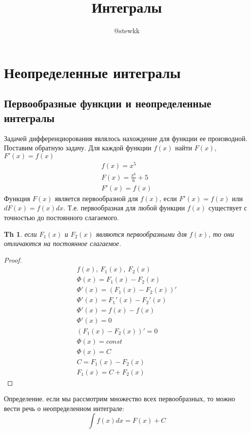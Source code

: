 \documentclass[12pt,a4paper]{article}
\title{Интегралы}
\author{@stewkk}
\newtheorem{theorem}{Th}
\begin{document}
\maketitle
\section{Неопределенные интегралы}
\subsection{Первообразные функции и неопределенные интегралы}
Задачей дифференциорования являлось нахождение для функции ее производной.
Поставим обратную задачу.
Для каждой функции $f(x)$ найти $F(x)$, $F'(x)=f(x)$
    \begin{gather*}
    f(x) = x^5\\
    F(x) = \frac{x^6}{6} + 5\\
    F'(x) = f(x)
    \end{gather*}
Функция $F(x)$ является первообразной для $f(x)$, если $F'(x)=f(x)$ или $dF(x)=f(x)dx$.
Т.е. первообразная для любой функции $f(x)$ существует с точностью до постоянного слагаемого.

\begin{theorem}
    если $F_1(x)$ и $F_2(x)$ являются первообразными для $f(x)$, то они отличаются на постоянное слагаемое.
\end{theorem}

\begin{proof}
\begin{gather*}
    f(x),\ F_1(x),\ F_2(x) \\
    \Phi(x) = F_1(x) - F_2(x) \\
    \Phi'(x) = (F_1(x) - F_2(x))' \\
    \Phi'(x) = F_1'(x) - F_2'(x) \\
    \Phi'(x) = f(x) - f(x) \\
    \Phi'(x) = 0 \\
    (F_1(x) - F_2(x))' = 0 \\
    \Phi(x) = const \\
    \Phi(x) = C \\
    C = F_1(x) - F_2(x) \\
    F_1(x) = C + F_2(x)
\end{gather*}
\end{proof}

Определение. если мы рассмотрим множество всех первообразных, то можно вести речь о неопределенном интеграле:
\[ \int f(x)dx = F(x) + C \]
\end{document}
